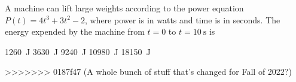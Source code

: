 \documentclass{../../oss-apphys-exam}
\begin{document}
\begin{multicols*}{2}
\begin{questions}
\begin{questions}
{%
%
%
    
    \question A machine can lift large weights according to the power equation
    $P(t)=4t^3+3t^2-2$, where power is in watts and time is in seconds. The
    energy expended by the machine from $t=0$ to $t=\SI{10}{\second}$ is
    \begin{choices}
      \choice \SI{1260}{\joule}
      \choice \SI{3630}{\joule}
      \choice \SI{9240}{\joule}
      \choice \SI{10980}{\joule}
      \choice \SI{18150}{\joule}
    \end{choices}
>>>>>>> 0187f47 (A whole bunch of stuff that's changed for Fall of 2022?)
    
}
\end{questions}
\end{questions}
\end{multicols*}
\end{document}

